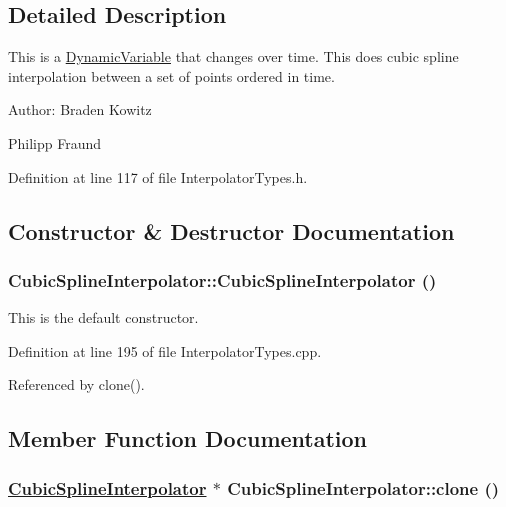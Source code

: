 \subsection{Detailed Description}
This is a \hyperlink{classDynamicVariable}{Dynamic\-Variable} that changes over time. This does cubic spline interpolation between a set of points ordered in time. \begin{Desc}
\item[Author:]Braden Kowitz 

Philipp Fraund \end{Desc}




Definition at line 117 of file Interpolator\-Types.h.

\subsection{Constructor \& Destructor Documentation}
\hypertarget{classCubicSplineInterpolator_a0}{
\subsubsection[CubicSplineInterpolator]{\setlength{\rightskip}{0pt plus 5cm}Cubic\-Spline\-Interpolator::Cubic\-Spline\-Interpolator ()}}
\label{classCubicSplineInterpolator_a0}


This is the default constructor. 

Definition at line 195 of file Interpolator\-Types.cpp.

Referenced by clone().

\subsection{Member Function Documentation}
\hypertarget{classCubicSplineInterpolator_a1}{
\subsubsection[clone]{\setlength{\rightskip}{0pt plus 5cm}\hyperlink{classCubicSplineInterpolator}{Cubic\-Spline\-Interpolator} $\ast$ Cubic\-Spline\-Interpolator::clone ()}}
\label{classCubicSplineInterpolator_a1}


